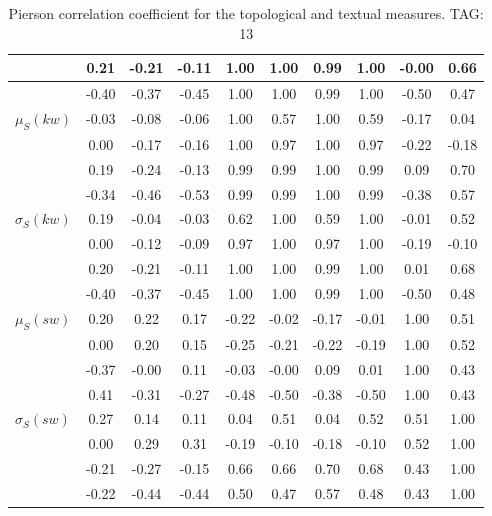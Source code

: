 \begin{table*}[h!]
\begin{center}
\begin{tabular}{| l | c | c | c | c | c | c | c | c | c |}
 & 0.21  & -0.21  & -0.11  & 1.00  & 1.00  & 0.99  & 1.00  & -0.00  & 0.66 \\\hline
 & -0.40  & -0.37  & -0.45  & 1.00  & 1.00  & 0.99  & 1.00  & -0.50  & 0.47 \\\hline
$\mu_S(kw)$ & -0.03  & -0.08  & -0.06  & 1.00  & 0.57  & 1.00  & 0.59  & -0.17  & 0.04 \\\hline
 & 0.00  & -0.17  & -0.16  & 1.00  & 0.97  & 1.00  & 0.97  & -0.22  & -0.18 \\\hline
 & 0.19  & -0.24  & -0.13  & 0.99  & 0.99  & 1.00  & 0.99  & 0.09  & 0.70 \\\hline
 & -0.34  & -0.46  & -0.53  & 0.99  & 0.99  & 1.00  & 0.99  & -0.38  & 0.57 \\\hline
$\sigma_S(kw)$ & 0.19  & -0.04  & -0.03  & 0.62  & 1.00  & 0.59  & 1.00  & -0.01  & 0.52 \\\hline
 & 0.00  & -0.12  & -0.09  & 0.97  & 1.00  & 0.97  & 1.00  & -0.19  & -0.10 \\\hline
 & 0.20  & -0.21  & -0.11  & 1.00  & 1.00  & 0.99  & 1.00  & 0.01  & 0.68 \\\hline
 & -0.40  & -0.37  & -0.45  & 1.00  & 1.00  & 0.99  & 1.00  & -0.50  & 0.48 \\\hline
$\mu_S(sw)$ & 0.20  & 0.22  & 0.17  & -0.22  & -0.02  & -0.17  & -0.01  & 1.00  & 0.51 \\\hline
 & 0.00  & 0.20  & 0.15  & -0.25  & -0.21  & -0.22  & -0.19  & 1.00  & 0.52 \\\hline
 & -0.37  & -0.00  & 0.11  & -0.03  & -0.00  & 0.09  & 0.01  & 1.00  & 0.43 \\\hline
 & 0.41  & -0.31  & -0.27  & -0.48  & -0.50  & -0.38  & -0.50  & 1.00  & 0.43 \\\hline
$\sigma_S(sw)$ & 0.27  & 0.14  & 0.11  & 0.04  & 0.51  & 0.04  & 0.52  & 0.51  & 1.00 \\\hline
 & 0.00  & 0.29  & 0.31  & -0.19  & -0.10  & -0.18  & -0.10  & 0.52  & 1.00 \\\hline
 & -0.21  & -0.27  & -0.15  & 0.66  & 0.66  & 0.70  & 0.68  & 0.43  & 1.00 \\\hline
 & -0.22  & -0.44  & -0.44  & 0.50  & 0.47  & 0.57  & 0.48  & 0.43  & 1.00 \\\hline
\end{tabular}
\caption{Pierson correlation coefficient for the topological and textual measures. TAG: 13}
\end{center}
\end{table*}